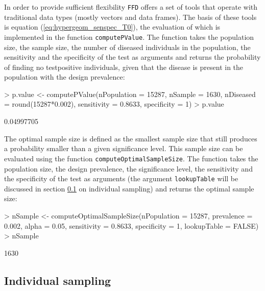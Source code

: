 \documentclass[nojss]{jss}
\begin{document}
In order to provide sufficient flexibility \texttt{FFD} offers a set of tools that operate with traditional data types (mostly vectors and data frames). The basis of these tools is equation (\ref{eq:hypergeom_senspec_T0}), the evaluation of which is implemented in the function \texttt{computePValue}.  The function takes the population size, the sample size, the number of diseased individuals in the population, the sensitivity and the specificity of the test as arguments and returns the probability of finding no testpositive individuals, given that the disease is present in the population with the design prevalence:

\begin{Schunk}
\begin{Sinput}
> p.value <- computePValue(nPopulation = 15287, nSample = 1630,
       nDiseased = round(15287*0.002), sensitivity = 0.8633,
       specificity = 1)
> p.value
\end{Sinput}
\begin{Soutput}
[1] 0.04997705
\end{Soutput}
\end{Schunk}

The optimal sample size is defined as the smallest sample size that still produces a probability smaller than a given significance level. This sample size can be evaluated using the function \texttt{computeOptimalSampleSize}. The function takes the population size, the design prevalence, the significance level, the sensitivity and the specificity of the test as arguments (the argument \texttt{lookupTable} will be discussed in section \ref{subsec:ind-sampling-noclass} on individual sampling) and returns the optimal sample size:

\begin{Schunk}
\begin{Sinput}
> nSample <- computeOptimalSampleSize(nPopulation = 15287,
       prevalence = 0.002, alpha = 0.05, sensitivity = 0.8633,
       specificity = 1, lookupTable = FALSE)
> nSample
\end{Sinput}
\begin{Soutput}
[1] 1630
\end{Soutput}
\end{Schunk}


\subsection{Individual sampling} \label{subsec:ind-sampling-noclass}
\end{document}

